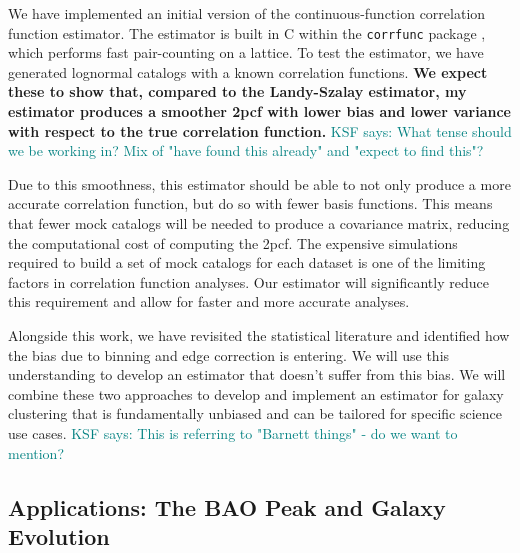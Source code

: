 \documentclass[12pt, fullpage, letterpaper]{article}
\newcommand{\KSF}[1]{\textcolor{teal}{KSF says: #1}}
\newcommand{\cf}{2pcf\xspace}
\begin{document}
We have implemented an initial version of the continuous-function correlation function estimator.
The estimator is built in C within the \texttt{corrfunc} package \citep{Sinha2017}, which performs fast pair-counting on a lattice.
To test the estimator, we have generated lognormal catalogs with a known correlation functions. 
\textbf{We expect these to show that, compared to the Landy-Szalay estimator, my estimator produces a smoother \cf with lower bias and lower variance with respect to the true correlation function.} \KSF{What tense should we be working in? Mix of "have found this already" and "expect to find this"?}

Due to this smoothness, this estimator should be able to not only produce a more accurate correlation function, but do so with fewer basis functions.
This means that fewer mock catalogs will be needed to produce a covariance matrix, reducing the computational cost of computing the \cf.
The expensive simulations required to build a set of mock catalogs for each dataset is one of the limiting factors in correlation function analyses.
Our estimator will significantly reduce this requirement and allow for faster and more accurate analyses.

Alongside this work, we have revisited the statistical literature and identified how the bias due to binning and edge correction is entering. 
We will use this understanding to develop an estimator that doesn't suffer from this bias.
We will combine these two approaches to develop and implement an estimator for galaxy clustering that is fundamentally unbiased and can be tailored for specific science use cases.
\KSF{This is referring to "Barnett things" - do we want to mention?}

\subsection{Applications: The BAO Peak and Galaxy Evolution}
\end{document}

